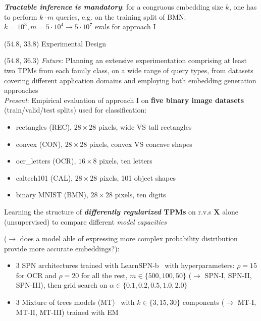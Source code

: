 \documentclass[final]{beamer}
\begin{document}
\begin{frame}{}
\begin{textblock}{25.2}
  \emph{\textbf{Tractable inference is mandatory}}:
  for a congruous embedding size $k$, one has to perform $k\cdot
    m$ queries, e.g. on the training split of \textsf{BMN}: $k=10^{3},m=5\cdot
    10^{4}\rightarrow 5\cdot 10^{7}$ evals for approach I
  
  \end{textblock}



  \begin{textblock}{20}(54.8, 33.8)
    Experimental Design
  \end{textblock}

  \begin{textblock}{25.2}(54.8, 36.3)
    \small
    \emph{Future}: Planning an extensive experimentation comprising at least two TPMs
    from each family class, on a wide range of query types, from
    datasets covering different application domains and employing both
    embedding generation approaches\\[20pt]
    
    \emph{Present}: Empirical evaluation of approach I on \textbf{five binary image datasets}
    (train/valid/test splits) used for classification:
    \begin{itemize}
    \item rectangles (\textsf{REC}), $28\times 28$ pixels, wide VS
      tall rectangles
    \item convex (\textsf{CON}), $28\times 28$ pixels, convex VS
      concave shapes
    \item ocr\_letters (\textsf{OCR}), $16\times 8$ pixels, ten letters
    \item caltech101 (\textsf{CAL}), $28\times 28$ pixels, 101 object shapes
    \item binary MNIST (\textsf{BMN}), $28\times 28$ pixels, ten
      digits
    \end{itemize}\vspace{15pt}
    
    Learning the structure of \textbf{\emph{differently regularized} TPMs} on r.v.s
    $\mathbf{X}$ alone (unsupervised) to compare different \emph{model
      capacities}\par
    ($\rightarrow$ does a model able of expressing more
    complex probability distribution provide more accurate embeddings?):
    \begin{itemize}
    \item 3 SPN architectures trained with
      \textsf{LearnSPN-b}~\parencite{Vergari2015} with
      hyperparameters: $\rho=15$ for \textsf{OCR}
      and $\rho=20$ for all the rest, $m\in\{500,
      100, 50\}$  ($\rightarrow$ \textsf{SPN-I}, \textsf{SPN-II},
      \textsf{SPN-III}), then grid search on $\alpha\in\{0.1, 0.2,
      0.5, 1.0, 2.0\}$
    \item 3 Mixture of trees models (MT)~\parencite{Meila2000} with $k\in\{3,15,30\}$
      components ($\rightarrow$ \textsf{MT-I}, \textsf{MT-II},
      \textsf{MT-III}) trained with EM
    \end{itemize}\vspace{15pt}
    

\end{textblock}
\end{frame}
\end{document}
